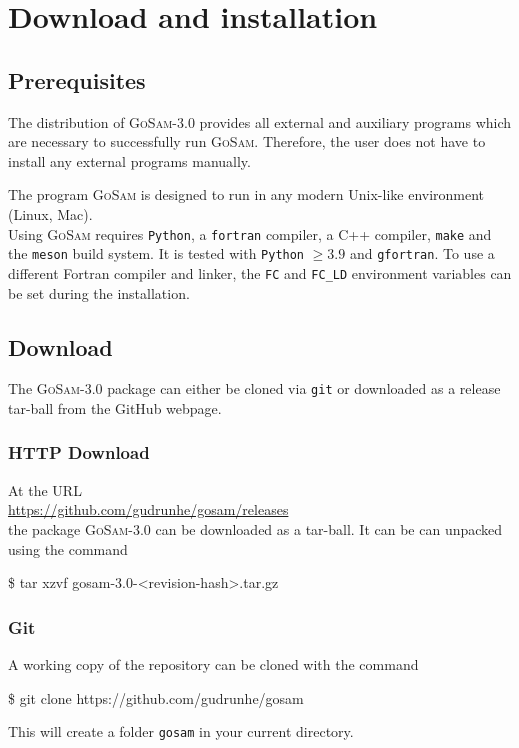 \documentclass[11pt,a4paper]{refrep}
\newcommand{\gosamversion}{{3{.}0}}
\newcommand{\gosam}{\textsc{GoSam}\xspace}
\newcommand{\packagename}{{gosam-\gosamversion-<revision-hash>}}
\begin{document}
\chapter{Download and installation}
\section{Prerequisites}

The distribution of \gosam-\gosamversion{} provides all external and auxiliary programs which are necessary 
to successfully run \gosam. 
Therefore, the user does not have to install any external programs manually.

The program \gosam is designed to run in any modern Unix-like environment (Linux, Mac).\\
Using \gosam requires \texttt{Python}, a \texttt{fortran} compiler, a C++ compiler, \texttt{make} and the \texttt{meson} build system. It is tested with \texttt{Python} $\geq 3.9$ and \texttt{gfortran}.
To use a different Fortran compiler and linker, the {\tt FC} and {\tt FC\_LD} environment variables can
be set during the installation.


\section{Download}

The \gosam-\gosamversion{} package can either be cloned 
via \texttt{git}
or downloaded as a release tar-ball from the GitHub webpage.

\subsection*{HTTP Download}
At the URL \\
\url{https://github.com/gudrunhe/gosam/releases}\\
the package
\gosam-\gosamversion{} can be downloaded as a tar-ball. 
It can be can unpacked using the command
\begin{example}
\$ tar xzvf \packagename{}.tar.gz
\end{example}

\subsection*{Git}
A working copy of the repository can be cloned with the command
\begin{example}
\$ git clone https://github.com/gudrunhe/gosam
\end{example}
This will create a folder \texttt{gosam} in your current directory.
\end{document}
